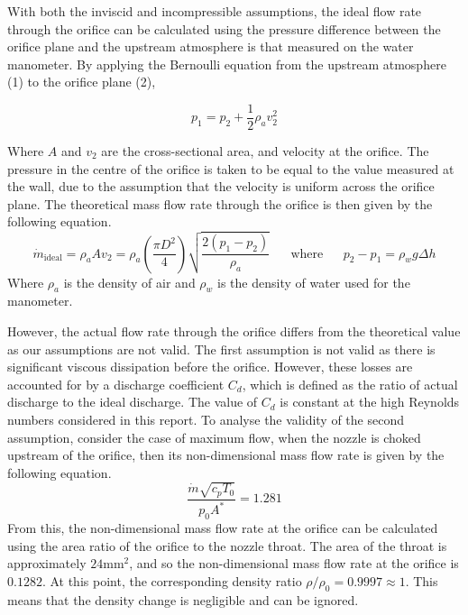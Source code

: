 \documentclass{article}
\begin{document}
With both the inviscid and incompressible assumptions, the ideal flow rate through the orifice can be calculated using the pressure difference between the orifice plane and the upstream atmosphere is that measured on the
water manometer. By applying the Bernoulli equation from the upstream atmosphere (1) to the orifice plane (2),

\begin{equation}
    p_1 = p_2 + \frac{1}{2} \rho_a v_2^2
\end{equation}

Where $A$ and $v_2$ are the cross-sectional area, and velocity at the orifice. The pressure in the centre of the orifice is taken to be equal to the value measured at the wall, due to the assumption that the velocity is uniform across the orifice plane.
The theoretical mass flow rate through the orifice is then given by the following equation.
\begin{equation}
    \dot{m}_\text{ideal} = \rho_a A v_2 = \rho_a \left( \frac{\pi D^2}{4}\right) \sqrt{\frac{2(p_1-p_2)}{\rho_a}} \;\;\;\;\;\; \text{where} \;\;\;\;\;\ p_2 - p_1 = \rho_w g \Delta h
\end{equation}
Where $\rho_a$ is the density of air and $\rho_w$ is the density of water used for the manometer.

However, the actual flow rate through the orifice differs from the theoretical value as our assumptions are not valid.
The first assumption is not valid as there is significant viscous dissipation before the orifice.
However, these losses are accounted for by a discharge coefficient $C_d$, which is defined as the ratio of actual discharge to the ideal discharge.
The value of $C_d$ is constant at the high Reynolds numbers considered in this report.
To analyse the validity of the second assumption, consider the case of maximum flow, when the nozzle is choked upstream of the orifice, then its non-dimensional mass flow rate is given by the following equation.
\begin{equation}
    \frac{\dot{m}\sqrt{c_pT_0}}{p_0A^*} = 1.281
\end{equation}
From this, the non-dimensional mass flow rate at the orifice can be calculated using the area ratio of the orifice to the nozzle throat.
The area of the throat is approximately $24\text{mm}^2$, and so the non-dimensional mass flow rate at the orifice is $0.1282$.
At this point, the corresponding density ratio $\rho/\rho_0 = 0.9997 \approx 1$. This means that the density change is negligible and can be ignored.
\end{document}

